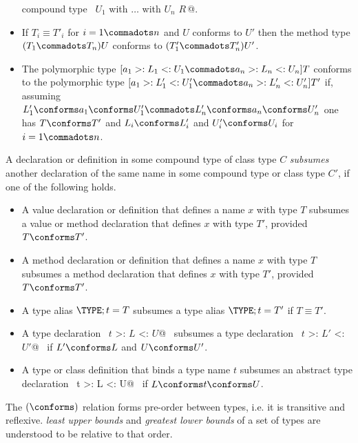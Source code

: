 \begin{itemize}
      compound type ~\lstinline@$U_1$ with $\ldots$ with $U_n$ {$R\,$}@.
\item If
        $T_i \equiv T'_i$ for $i = 1 \commadots n$ and $U$ conforms to $U'$ 
        then the method type $(T_1 \commadots T_n) U$ conforms to
        $(T'_1 \commadots T'_n) U'$.
\item The polymorphic type
$[a_1 >: L_1 <: U_1 \commadots a_n >: L_n <: U_n] T$ conforms to the polymorphic type
$[a_1 >: L'_1 <: U'_1 \commadots a_n >: L'_n <: U'_n] T'$ if, assuming
$L'_1 \conforms a_1 \conforms U'_1 \commadots L'_n \conforms a_n \conforms U'_n$ 
one has $T \conforms T'$ and $L_i \conforms L'_i$ and $U'_i \conforms U_i$
for $i = 1 \commadots n$.
\end{itemize}

A declaration or definition in some compound type of class type $C$
{\em subsumes} another
declaration of the same name in some compound type or class type $C'$, if one of the following holds.
\begin{itemize}
\item
A value declaration or definition that defines a name $x$ with type $T$ subsumes 
a value or method declaration that defines $x$ with type $T'$, provided $T \conforms T'$.
\item 
A method declaration or definition that defines a name $x$ with type $T$ subsumes 
a method declaration that defines $x$ with type $T'$, provided $T \conforms T'$.
\item
A type alias
$\TYPE;t=T$ subsumes a type alias $\TYPE;t=T'$ if
$T \equiv T'$.
\item 
A type declaration ~\lstinline@type $t$ >: $L$ <: $U$@~ subsumes
a type declaration ~\lstinline@type $t$ >: $L'$ <: $U'$@~ if $L' \conforms L$ and 
$U \conforms U'$.
\item
A type or class definition that binds a type name $t$ subsumes an abstract
type declaration ~\lstinline@type t >: L <: U@~ if
$L \conforms t \conforms U$.
\end{itemize}

The $(\conforms)$ relation forms pre-order between types,
i.e. it is transitive and reflexive. {\em
least upper bounds} and {\em greatest lower bounds} of a set of types
are understood to be relative to that order.

